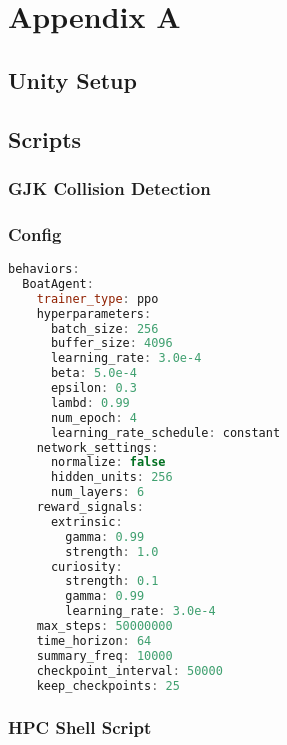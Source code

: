 %
%

\chapter{Appendix A}\label{app:app01}

\section{Unity Setup}\label{sec:unity_setup}

\section{Scripts}

\subsection*{GJK Collision Detection}

\subsection*{Config}\label{config}
\begin{adjustbox}{width=\textwidth/2}
\begin{lstlisting}[language=C++]
    behaviors:
  BoatAgent:
    trainer_type: ppo
    hyperparameters:
      batch_size: 256
      buffer_size: 4096
      learning_rate: 3.0e-4
      beta: 5.0e-4
      epsilon: 0.3
      lambd: 0.99
      num_epoch: 4
      learning_rate_schedule: constant
    network_settings:
      normalize: false
      hidden_units: 256
      num_layers: 6
    reward_signals:
      extrinsic:
        gamma: 0.99
        strength: 1.0
      curiosity:
        strength: 0.1
        gamma: 0.99
        learning_rate: 3.0e-4
    max_steps: 50000000
    time_horizon: 64
    summary_freq: 10000
    checkpoint_interval: 50000
    keep_checkpoints: 25
\end{lstlisting}
\end{adjustbox}

\subsection*{HPC Shell Script}\label{sec:shell_script}







\